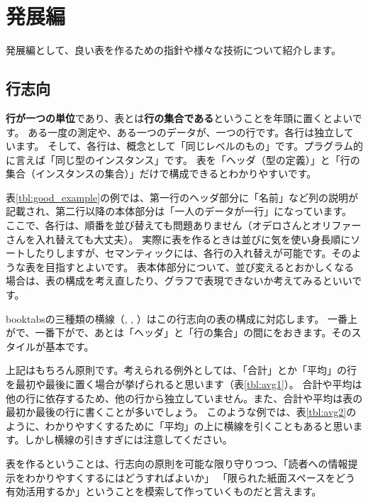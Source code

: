 \documentclass[uplatex,onecolumn,9pt,dvipdfmx]{jsarticle}
\newcommand{\Tref}[1]{表\ref{#1}}
\begin{document}
\section{発展編}
発展編として、良い表を作るための指針や様々な技術について紹介します。

\subsection{行志向}
\textbf{行が一つの単位}であり、表とは\textbf{行の集合である}ということを年頭に置くとよいです。
ある一度の測定や、ある一つのデータが、一つの行です。各行は独立しています。
そして、各行は、概念として「同じレベルのもの」です。プラグラム的に言えば「同じ型のインスタンス」です。
表を「ヘッダ（型の定義）」と「行の集合（インスタンスの集合）」だけで構成できるとわかりやすいです。

\Tref{tbl:good_example}の例では、第一行のヘッダ部分に「名前」など列の説明が記載され、第二行以降の本体部分は「一人のデータが一行」になっています。
ここで、各行は、順番を並び替えても問題ありません（オデロさんとオリファーさんを入れ替えても大丈夫）。
実際に表を作るときは並びに気を使い身長順にソートしたりしますが、セマンティックには、各行の入れ替えが可能です。そのような表を目指すとよいです。
表本体部分について、並び変えるとおかしくなる場合は、表の構成を考え直したり、グラフで表現できないか考えてみるといいです。

booktabsの三種類の横線（\texttt{\toprule}, \texttt{\midrule}, \texttt{\bottomrule}）はこの行志向の表の構成に対応します。
一番上が\texttt{\toprule}で、一番下が\texttt{\bottomrule}で、あとは「ヘッダ」と「行の集合」の間に\texttt{\midrule}をおきます。そのスタイルが基本です。

上記はもちろん原則です。考えられる例外としては、「合計」とか「平均」の行を最初や最後に置く場合が挙げられると思います（\Tref{tbl:avg1}）。
合計や平均は他の行に依存するため、他の行から独立していません。また、合計や平均は表の最初か最後の行に書くことが多いでしょう。
このような例では、\Tref{tbl:avg2}のように、わかりやすくするために「平均」の上に横線を引くこともあると思います。しかし横線の引きすぎには注意してください。

表を作るということは、行志向の原則を可能な限り守りつつ、「読者への情報提示をわかりやすくするにはどうすればよいか」
「限られた紙面スペースをどう有効活用するか」ということを模索して作っていくものだと言えます。
\end{document}
